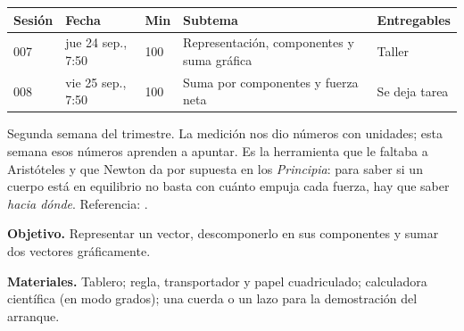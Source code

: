 \documentclass[11pt]{article}
\begin{document}
\encabezado*

\begin{center}
{\renewcommand{\arraystretch}{1.3}
\begin{tabularx}{\linewidth}{@{}l l l X l@{}}
  \toprule
  \textbf{Sesión} & \textbf{Fecha} & \textbf{Min} & \textbf{Subtema} & \textbf{Entregables}\\
  \midrule
  007 & jue 24 sep., 7:50 & 100 & Representación, componentes y suma gráfica & Taller\\
  008 & vie 25 sep., 7:50 & 100 & Suma por componentes y fuerza neta & Se deja tarea\\
  \bottomrule
\end{tabularx}}
\end{center}

Segunda semana del trimestre. La medición nos dio números con unidades; esta semana esos
números aprenden a apuntar. Es la herramienta que le faltaba a Aristóteles y que Newton da por
supuesta en los \emph{Principia}: para saber si un cuerpo está en equilibrio no basta con
cuánto empuja cada fuerza, hay que saber \emph{hacia dónde}. Referencia: .


\textbf{Objetivo.} Representar un vector, descomponerlo en sus componentes y sumar dos
vectores gráficamente.

\textbf{Materiales.} Tablero; regla, transportador y papel cuadriculado; calculadora
científica (en modo grados); una cuerda o un lazo para la demostración del arranque.
\end{document}
